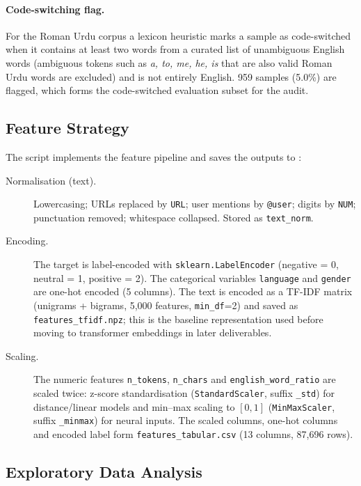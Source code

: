 \documentclass[11pt,a4paper]{article}
\begin{document}
\paragraph{Code-switching flag.} For the Roman Urdu corpus a lexicon heuristic marks a sample as
code-switched when it contains at least two words from a curated list of unambiguous English
words (ambiguous tokens such as \emph{a, to, me, he, is} that are also valid Roman Urdu words are
excluded) and is not entirely English. 959 samples (5.0\%) are flagged, which forms the
code-switched evaluation subset for the audit.

\subsection{Feature Strategy}
The script  implements the feature pipeline and saves the
outputs to :

\begin{description}
  \item[Normalisation (text).] Lowercasing; URLs replaced by \texttt{URL}; user mentions by
        \texttt{@user}; digits by \texttt{NUM}; punctuation removed; whitespace collapsed. Stored
        as \texttt{text\_norm}.
  \item[Encoding.] The target is label-encoded with \texttt{sklearn.LabelEncoder}
        (negative = 0, neutral = 1, positive = 2). The categorical variables \texttt{language}
        and \texttt{gender} are one-hot encoded (5 columns). The text is encoded as a TF-IDF
        matrix (unigrams + bigrams, 5,000 features, \texttt{min\_df}=2) and saved as
        \texttt{features\_tfidf.npz}; this is the baseline representation used before moving to
        transformer embeddings in later deliverables.
  \item[Scaling.] The numeric features \texttt{n\_tokens}, \texttt{n\_chars} and
        \texttt{english\_word\_ratio} are scaled twice: z-score standardisation
        (\texttt{StandardScaler}, suffix \texttt{\_std}) for distance/linear models and min--max
        scaling to $[0,1]$ (\texttt{MinMaxScaler}, suffix \texttt{\_minmax}) for neural
        inputs. The scaled columns, one-hot columns and encoded label form
        \texttt{features\_tabular.csv} (13 columns, 87,696 rows).
\end{description}

\subsection{Exploratory Data Analysis}
\end{document}
